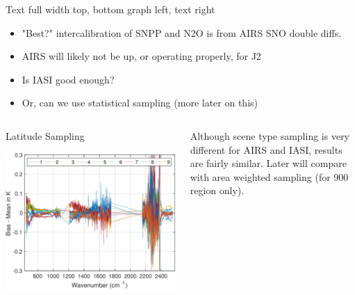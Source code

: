 \documentclass[10pt,t]{beamer}
\begin{document}
\begin{frame}[label={sec:orgb65959b}]{Text full width top, bottom graph left, text right}
  \vspace{-0.1in}
  \begin{itemize}
  \item "Best?" intercalibration of SNPP and N2O is from AIRS SNO double diffs.
  \item AIRS will likely not be up, or operating properly, for J2
  \item Is IASI good enough?
  \item Or, can we use statistical sampling (more later on this)
  \end{itemize}

  \vspace{-0.2in}

  \begin{columns}
    \begin{column}{0.55\columnwidth}
      \begin{block}{\footnotesize Latitude Sampling}
        \vspace{-0.1in}
        \begin{center}
          \includegraphics[width=\linewidth]{./testfig.pdf}
        \end{center}
      \end{block}
    \end{column}


    \begin{column}{0.55\columnwidth}
      \begin{block}{\footnotesize}
        \small
        Although scene type sampling is very different for AIRS and IASI, results are fairly similar.  Later will compare with area weighted sampling (for 900 \wn region only).
      \end{block}
    \end{column}
  \end{columns}
\end{frame}
\end{document}
